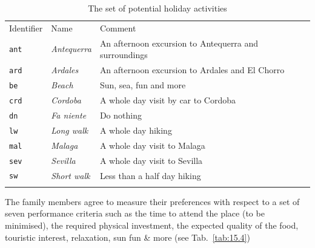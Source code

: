 \begin{table}[ht]
\caption{The set of potential holiday activities}
\label{tab:15.3}       %
\begin{center}
\begin{small}
    \begin{tabular}{l l l}
      \svhline\noalign{\smallskip}
      Identifier & Name & Comment \\
      \noalign{\smallskip}\hline\noalign{\smallskip}
      \texttt{ant }  & \emph{Antequerra}  & An afternoon excursion to Antequerra and surroundings\\
      \texttt{ard}  & \emph{Ardales}  & An afternoon excursion to Ardales and El Chorro\\
      \texttt{be}   & \emph{Beach}  &  Sun, sea, fun and more\\
      \texttt{crd}  & \emph{Cordoba}  &  A whole day visit by car to Cordoba\\
      \texttt{dn}   & \emph{Fa niente}   &  Do nothing\\
      \texttt{lw}   & \emph{Long walk}   &  A whole day hiking\\
      \texttt{mal}  & \emph{Malaga}   &  A whole day visit to Malaga\\
      \texttt{sev}  & \emph{Sevilla}   &  A whole day visit to Sevilla\\
      \texttt{sw}   & \emph{Short walk} &  Less than a half day hiking\\
      \noalign{\smallskip}\hline
    \end{tabular}
\end{small}
\end{center}
\end{table}

The family members agree to measure their preferences with respect to a set of seven performance criteria such as the time to attend the place (to be minimised), the required physical investment, the expected quality of the food, touristic interest, relaxation, sun fun \& more (see Tab.~\vref{tab:15.4})

